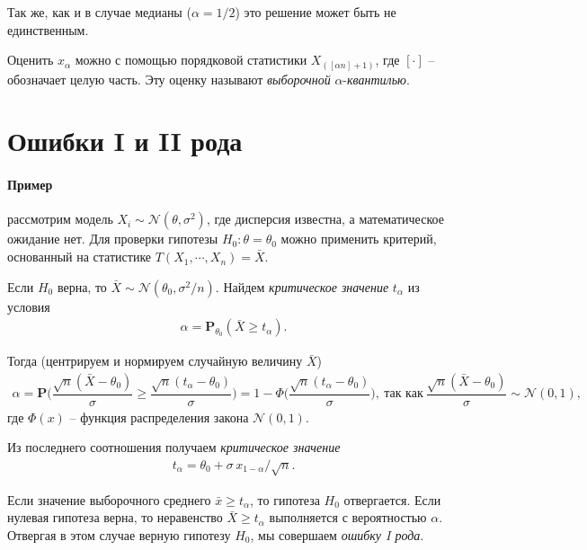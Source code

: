 \documentclass[%
	11pt,
	a4paper,
	utf8,
		]{article}
\begin{document}
Так же, как и в случае медианы ($ \alpha = 1/2 $) это решение может быть не единственным.

Оценить $ x_\alpha $ можно с помощью порядковой статистики $ X_{([\alpha n] + 1)} $, где $ [\cdot] $ -- обозначает целую часть. Эту оценку называют \emph{выборочной} $ \alpha $-\emph{квантилью}.

\section{Ошибки I и II рода}

\paragraph{Пример} рассмотрим модель $ X_i \sim \mathcal{N}(\theta, \sigma^2) $, где дисперсия известна, а математическое ожидание нет. Для проверки гипотезы $ H_0: \theta = \theta_0 $ можно применить критерий, основанный на статистике $ T(X_1, \cdots, X_n) = \bar{X} $.

Если $ H_0 $ верна, то $ \bar{X} \sim \mathcal{N}(\theta_0, \sigma^2/n) $. Найдем \emph{критическое значение} $ t_\alpha $ из условия
\begin{align*}
	\alpha = \mathbf{P}_{\theta_0} (\bar{X} \geqslant t_\alpha).
\end{align*}

Тогда (центрируем и нормируем случайную величину $ \bar{X} $)
\begin{align*}
	\alpha = \mathbf{P} \Bigg( \dfrac{\sqrt{n} (\bar{X} - \theta_0)}{\sigma} \geqslant \dfrac{\sqrt{n} (t_\alpha - \theta_0)}{\sigma} \Bigg) = 1 - \Phi\Bigg(\dfrac{\sqrt{n} (t_\alpha - \theta_0)}{\sigma}\Bigg), \ \text{так как} \ \dfrac{\sqrt{n} (\bar{X} - \theta_0)}{\sigma} \sim \mathcal{N}(0, 1),
\end{align*}
где $ \Phi(x) $ -- функция распределения закона $ \mathcal{N}(0, 1) $.

Из последнего соотношения получаем \emph{критическое значение}
\begin{align*}
	t_\alpha = \theta_0 + \sigma \, x_{1 - \alpha} / \sqrt{n}.
\end{align*}

Если значение выборочного среднего $ \bar{x} \geqslant t_\alpha$, то гипотеза $ H_0 $ отвергается. Если нулевая гипотеза верна, то неравенство $ \bar{X} \geqslant t_\alpha $ выполняется с вероятностью $ \alpha $. Отвергая в этом случае верную гипотезу $ H_0 $, мы совершаем \emph{ошибку I рода}.
\end{document}

